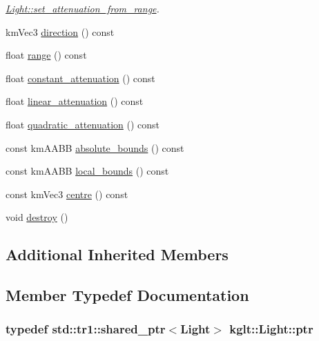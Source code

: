 \begin{DoxyCompactItemize}
\begin{DoxyCompactList}\small\item\em \hyperlink{classkglt_1_1_light_a2fbc17df0ec1fdffd9219efaf27f9aec}{Light\-::set\-\_\-attenuation\-\_\-from\-\_\-range}. \end{DoxyCompactList}\item 
km\-Vec3 \hyperlink{classkglt_1_1_light_ac1edacfda5bb5e7036391a366a0f826e}{direction} () const 
\item 
float \hyperlink{classkglt_1_1_light_a2800e919426652e682190344175575a8}{range} () const 
\item 
float \hyperlink{classkglt_1_1_light_ac4a06f65fd393bc06adbd238988bd803}{constant\-\_\-attenuation} () const 
\item 
float \hyperlink{classkglt_1_1_light_a2bba8471b6de4edab57a885e5d069246}{linear\-\_\-attenuation} () const 
\item 
float \hyperlink{classkglt_1_1_light_a1486a41102272d8a5326be5828231f3e}{quadratic\-\_\-attenuation} () const 
\item 
const km\-A\-A\-B\-B \hyperlink{classkglt_1_1_light_ac76e85c32d233527bce4d9eeeb1928c3}{absolute\-\_\-bounds} () const 
\item 
const km\-A\-A\-B\-B \hyperlink{classkglt_1_1_light_a4dbef1a6567ee7fa7331c18db83ca8b9}{local\-\_\-bounds} () const 
\item 
const km\-Vec3 \hyperlink{classkglt_1_1_light_aa255bb8d061ec1947d4cea5f7ddfea84}{centre} () const 
\item 
void \hyperlink{classkglt_1_1_light_a53c4ea56c60cbd5968d5edd5911562e9}{destroy} ()
\end{DoxyCompactItemize}
\subsection*{Additional Inherited Members}


\subsection{Member Typedef Documentation}
\hypertarget{classkglt_1_1_light_a85d7b5f4119c252f9f2851b55c254607}{
\subsubsection[{ptr}]{\setlength{\rightskip}{0pt plus 5cm}typedef std\-::tr1\-::shared\-\_\-ptr$<${\bf Light}$>$ {\bf kglt\-::\-Light\-::ptr}}}\label{classkglt_1_1_light_a85d7b5f4119c252f9f2851b55c254607}


